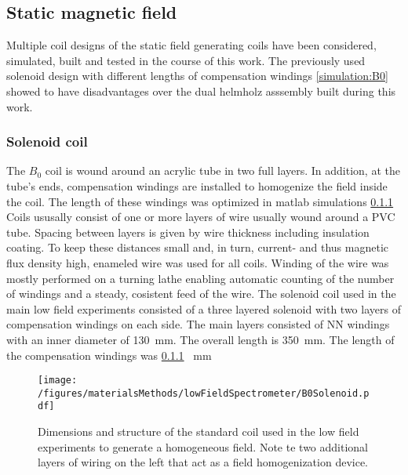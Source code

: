         \subsection{Static magnetic field}
            Multiple coil designs of the static field generating coils have been  considered, simulated, built and tested in the course of this work. The previously used solenoid design with different lengths of compensation windings \ref{simulation:B0} showed to have disadvantages over the dual helmholz asssembly built during this work.
        \subsubsection{Solenoid coil}
            The $B_0$ coil is wound around an acrylic tube in two full layers. In addition, at the
            tube's ends, compensation windings are installed to homogenize the field inside the coil.
            The length of these windings was optimized in matlab simulations \ref{} 
            Coils ususally consist of one or more layers of wire usually wound around a PVC tube. Spacing between layers is given by wire thickness including insulation coating. To keep  these distances small and, in turn, current- and thus magnetic flux density high, enameled wire was used for all coils. Winding of the wire was mostly performed on a turning lathe enabling automatic counting of the number of windings and a steady, cosistent feed of the wire.
            The solenoid coil used in the main low field experiments consisted of a three layered solenoid with two layers of compensation windings on each side. The main layers consisted of NN windings with an inner diameter of \SI{130}{\mm}. The overall length is \SI{350}{\milli\meter}. The length of the compensation windings was \ref{} \SI{}{\mm}
            \begin{figure}
                \centering
                \texttt{[image: /figures/materialsMethods/lowFieldSpectrometer/B0Solenoid.pdf]}
                \caption[B0 coil layout]{Dimensions and structure of the standard coil used in the low field experiments to generate a homogeneous field. Note te two additional layers of wiring on the left that act as a field homogenization device.}
            \end{figure}
